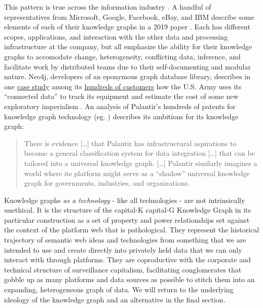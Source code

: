 This pattern is true across the information industry \cite{sequedaDesigningBuildingEnterprise2021} . A handful of
representatives from Microsoft, Google, Facebook, eBay, and IBM describe
some elements of each of their knowledge graphs in a 2019 paper \cite{noyIndustryscaleKnowledgeGraphs2019} . Each has different
scopes, applications, and interaction with the other data and processing
infrastructure at the company, but all emphasize the ability for their
knowledge graphs to accomodate change, heterogeneity, conflicting data,
inference, and facilitate work by distributed teams due to their
self-documenting and modular nature. Neo4j, developers of an eponymous
graph database library, describes in one
\href{https://neo4j.com/case-studies/us-army/}{case study} among its
\href{https://neo4j.com/customers/}{hundreds of customers} how the U.S.
Army uses its ``connected data'' to track its equipment and estimate the
cost of some new exploratory imperialism \cite{neo4jNeo4jArmyCase2021} . An analysis of Palantir's hundreds of
patents for knowledge graph technology (eg. \cite{cohenSystemMethodSharing2015, mathuraAutomatedDatabaseAnalysis2017, yousafSystemsMethodsUser2018, knudsonSystemsMethodsAnnotating2021} )
describes its ambitions for its knowledge graph:

\begin{quote}
There is evidence {[}\ldots{]} that Palantir has infrastructural
aspirations to become a general classification system for data
integration {[}\ldots{]} that can be tailored into a universal knowledge
graph. {[}\ldots{]} Palantir similarly imagines a world where its
platform might serve as a ``shadow'' universal knowledge graph for
governments, industries, and organizations. \cite{iliadisSeerSeenSurveying2022} 
\end{quote}

Knowledge graphs \emph{as a technology} - like all technologies - are
not intrinsically unethical. It is the structure of the capital-K
capital-G Knowledge Graph in its particular construction as a set of
property and power relationships set against the context of the platform
web that is pathological. They represent the historical trajectory of
semantic web ideas and technologies from something that we are intended
to use and create directly into privately held data that we can only
interact with through platforms. They are coproductive with the
corporate and technical structure of surveillance capitalism,
facilitating conglomerates that gobble up as many platforms and data
sources as possible to stitch them into an expanding, heterogeneous
graph of data. We will return to the underlying ideology of the
knowledge graph and an alternative in the final section.

